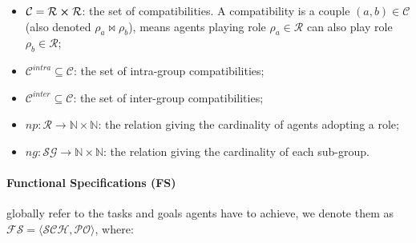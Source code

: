 \documentclass[runningheads]{llncs}
\newcounter{relation}
\begin{document}
\begin{itemize}
\begin{itemize}
              \item $\mathcal{C} = \mathcal{R} \cross \mathcal{R}$: the set of compatibilities. A compatibility is a couple $(a,b) \in \mathcal{C}$ (also denoted $\rho_a \bowtie \rho_b$), means agents playing role $\rho_a \in \mathcal{R}$ can also play role $\rho_b \in \mathcal{R}$;
              \item $\mathcal{C}^{intra} \subseteq \mathcal{C}$: the set of intra-group compatibilities;
              \item $\mathcal{C}^{inter} \subseteq \mathcal{C}$: the set of inter-group compatibilities;

              \item $np: \mathcal{R} \rightarrow \mathbb{N} \times \mathbb{N}$: the relation giving the cardinality of agents adopting a role;
              \item $ng: \mathcal{SG} \rightarrow \mathbb{N} \times \mathbb{N}$: the relation giving the cardinality of each sub-group.

          \end{itemize}

\end{itemize}

\paragraph{\textbf{Functional Specifications (FS)}} globally refer to the tasks and goals agents have to achieve, we denote them as $\mathcal{FS} = \langle \mathcal{SCH}, \mathcal{PO} \rangle$, where:
\end{document}
